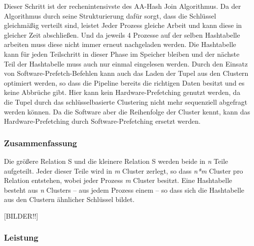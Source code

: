 Dieser Schritt ist der rechenintensivste des AA-Hash Join Algorithmus. Da der Algorithmus durch seine Strukturierung dafür sorgt, dass die Schlüssel gleichmäßig verteilt sind, leistet Jeder Prozess gleiche Arbeit und kann diese in gleicher Zeit abschließen. Und da jeweils 4 Prozesse auf der selben Hashtabelle arbeiten muss diese nicht immer erneut nachgeladen werden. Die Hashtabelle kann für jeden Teilschritt in dieser Phase im Speicher bleiben und der nächste Teil der Hashtabelle muss auch nur einmal eingelesen werden. Durch den Einsatz von Software-Prefetch-Befehlen kann auch das Laden der Tupel aus den Clustern optimiert werden, so dass die Pipeline bereits die richtigen Daten besitzt und es keine Abbrüche gibt. Hier kann kein Hardware-Prefetching genutzt werden, da die Tupel durch das schlüsselbasierte Clustering nicht mehr sequenziell abgefragt werden können. Da die Software aber die Reihenfolge der Cluster kennt, kann das Hardware-Prefetching durch Software-Prefetching ersetzt werden.

\subsubsection*{Zusammenfassung}
\label{sec:AA_Hash-Join_Zusammenfassung}

Die größere Relation S und die kleinere Relation S werden beide in \textit{n} Teile aufgeteilt. Jeder dieser Teile wird in \textit{m} Cluster zerlegt, so dass \textit{n*m} Cluster pro Relation entstehen, wobei jeder Prozess \textit{m} Cluster besitzt. Eine Hashtabelle besteht aus \textit{n} Clusters – aus jedem Prozess einem – so dass sich die Hashtabelle aus den Clustern ähnlicher Schlüssel bildet.


[BILDER!!]


\subsubsection*{Leistung}
\label{sec:AA_Hash-Join_Leistung}

